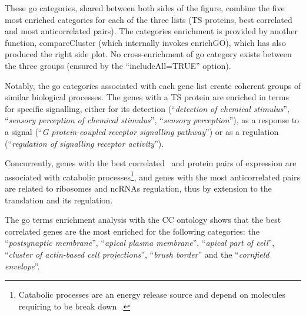 These \gls{go} categories, shared between both sides of the figure,
combine the five most enriched categories
for each of the three lists (\gls{TS} proteins, best correlated
and most anticorrelated pairs).
The categories enrichment is provided by another  function,
\textsf{compareCluster} (which internally invokes \textsf{enrichGO}),
which has also produced the right side plot.
No cross-enrichment of \gls{go} category exists between the three groups
(ensured by the \enquote{\textsf{includeAll=TRUE}} option).\mybr\

Notably, the \gls{go} categories associated with each gene list create
coherent groups of similar biological processes.
The genes with a \gls{TS} protein are enriched in terms for specific signalling,
either for its detection (\enquote{\textit{detection of chemical stimulus}},
\enquote{\textit{sensory perception of chemical stimulus}},
\enquote{\textit{sensory perception}}),
as a response to a signal (\enquote{\textit{G protein-coupled receptor signalling pathway}})
or as a regulation (\enquote{\textit{regulation of signalling receptor activity}}).\mybr\

Concurrently, genes with the best correlated \mRNA\ and protein pairs
of expression are associated with catabolic processes\footnote{%
Catabolic processes are an energy release source
and depend on molecules requiring to be break down~.},
and genes with the most anticorrelated pairs are related to
ribosomes and \glspl{ncRNA} regulation,
thus by extension to the translation and its regulation.\mybr\

The \gls{go} terms enrichment analysis with the CC ontology shows
that the best correlated genes are the most enriched
for the following categories:
the \enquote{\textit{postsynaptic membrane}},
\enquote{\textit{apical plasma membrane}},
\enquote{\textit{apical part of cell}},
\enquote{\textit{cluster of actin-based cell projections}},
\enquote{\textit{brush border}}
and the \enquote{\textit{cornfield envelope}}.\mybr\

